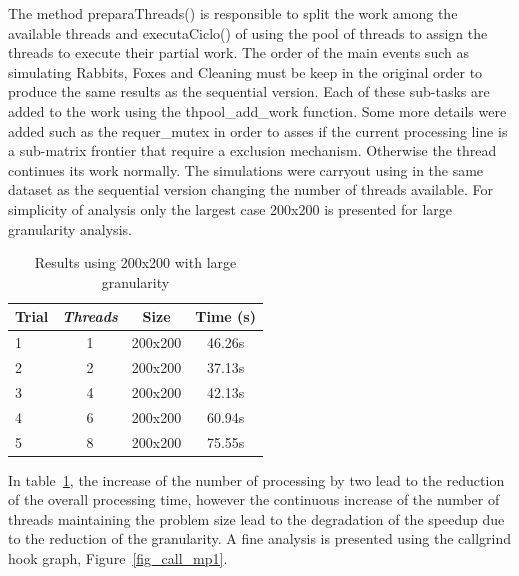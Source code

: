 \documentclass[10pt,a4paper,final]{report}
\begin{document}
The method preparaThreads() is responsible to split the work among the available threads and executaCiclo() of using the pool of threads to assign the threads to execute their partial work. The order of the main events such as simulating Rabbits, Foxes and Cleaning must be keep in the original order to produce the same results as the sequential version. Each of these sub-tasks are added to the work using the thpool\_add\_work function. Some more details were added such as the requer\_mutex in order to asses if the current processing line is a sub-matrix frontier that require a exclusion mechanism. Otherwise the thread continues its work normally.
The simulations were carryout using in the same dataset as the sequential version changing the number of threads available. For simplicity of analysis only the largest case 200x200 is presented for large granularity analysis.

\begin{table}[H]
  \begin{center}
    \begin{tabular}{ | l | c | c | c |}
      \hline
      \textbf{Trial} & \textbf{\textit{Threads}} & \textbf{Size} & \textbf{Time (s)}\\ \hline
      1 & 1 & 200x200 & 46.26s \\ \hline
      2 & 2 & 200x200 & 37.13s \\ \hline
      3 & 4 & 200x200 & 42.13s \\ \hline
      4 & 6 & 200x200 & 60.94s \\ \hline
      5 & 8 & 200x200 & 75.55s \\ \hline
     
  \end{tabular}
  \caption{Results using 200x200 with large granularity}
  \label{tbl:resultados2}
  \end{center}
\end{table}

In table~\ref{tbl:resultados2}, the increase of the number of processing by two lead to the reduction of the overall processing time, however the continuous increase of the number of threads maintaining the problem size lead to the degradation of the speedup due to the reduction of the granularity. A fine analysis is presented using the  callgrind hook graph, Figure~\ref{fig_call_mp1}.
\end{document}
